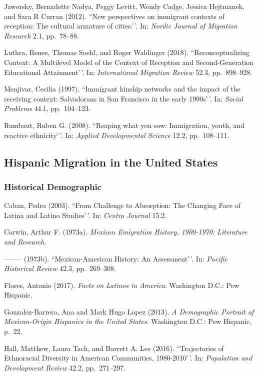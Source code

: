 \documentclass[11pt,]{article}
\begin{document}
Jaworsky, Bernadette Nadya, Peggy Levitt, Wendy Cadge, Jessica
Hejtmanek, and Sara R Curran (2012). ``New perspectives on immigrant
contexts of reception: The cultural armature of cities.'\,'. In:
\emph{Nordic Journal of Migration Research} 2.1, pp.~78--88.

Luthra, Renee, Thomas Soehl, and Roger Waldinger (2018).
``Reconceptualizing Context: A Multilevel Model of the Context of
Reception and Second‐Generation Educational Attainment'\,'. In:
\emph{International Migration Review} 52.3, pp.~898--928.

Menjivar, Cecilia (1997). ``Immigrant kinship networks and the impact of
the receiving context: Salvadorans in San Francisco in the early
1990s'\,'. In: \emph{Social Problems} 44.1, pp.~104--123.

Rumbaut, Ruben G. (2008). ``Reaping what you sow: Immigration, youth,
and reactive ethnicity'\,'. In: \emph{Applied Developmental Science}
12.2, pp.~108--111.

\hypertarget{hispanic-migration-in-the-united-states}{%
\subsection{Hispanic Migration in the United
States}\label{hispanic-migration-in-the-united-states}}

\hypertarget{historical-demographic}{%
\subsubsection{Historical Demographic}\label{historical-demographic}}

Caban, Pedro (2003). ``From Challenge to Absorption: The Changing Face
of Latina and Latino Studies'\,'. In: \emph{Centro Journal} 15.2.

Corwin, Arthur F. (1973a).
\emph{Mexican Emigration History, 1900-1970: Literature and Research}.

-------- (1973b). ``Mexican-American History: An Assessment'\,'. In:
\emph{Pacific Historical Review} 42.3, pp.~269--308.

Flores, Antonio (2017). \emph{Facts on Latinos in America}. Washington
D.C.: Pew Hispanic.

Gonzalez-Barrera, Ana and Mark Hugo Lopez (2013).
\emph{A Demographic Portrait of Mexican-Origin Hispanics in the United States}.
Washington D.C.: Pew Hispanic, p.~22.

Hall, Matthew, Laura Tach, and Barrett A. Lee (2016). ``Trajectories of
Ethnoracial Diversity in American Communities, 1980-2010'\,'. In:
\emph{Population and Development Review} 42.2, pp.~271--297.
\end{document}
